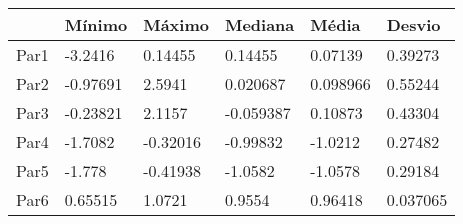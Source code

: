\begin{tabular}{llllll}
& Mínimo & Máximo & Mediana & Média & Desvio \\ 
\hline 
Par1 & -3.2416 & 0.14455 & 0.14455 & 0.07139 & 0.39273 \\ 
Par2 & -0.97691 & 2.5941 & 0.020687 & 0.098966 & 0.55244 \\ 
Par3 & -0.23821 & 2.1157 & -0.059387 & 0.10873 & 0.43304 \\ 
Par4 & -1.7082 & -0.32016 & -0.99832 & -1.0212 & 0.27482 \\ 
Par5 & -1.778 & -0.41938 & -1.0582 & -1.0578 & 0.29184 \\ 
Par6 & 0.65515 & 1.0721 & 0.9554 & 0.96418 & 0.037065 \\ 
\hline 
\end{tabular}